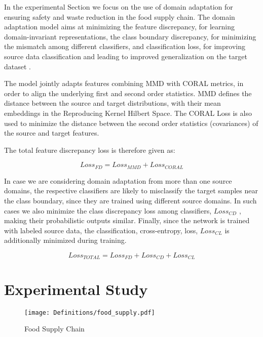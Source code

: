 \documentclass[journal,article,accept,moreauthors,pdftex]{Definitions/mdpi}
\begin{document}
In the experimental Section we focus on the use of domain adaptation for ensuring safety and waste reduction in the food supply chain. The domain adaptation model
aims at minimizing the feature discrepancy, for
learning domain-invariant representations, the class boundary
discrepancy, for minimizing the mismatch among different classifiers,
and classification loss, for improving source data classification and leading to improved generalization
on the target dataset \cite{ref25}.

The model jointly adapts
features combining MMD with CORAL metrics, in order to align the underlying first and second order statistics.
MMD defines the distance between the source and target distributions,
with their mean embeddings in the Reproducing Kernel Hilbert
Space. The CORAL Loss is also  used to minimize the distance between the second order
statistics (covariances) of the source and target features.

The total feature discrepancy loss is therefore given as: 

\begin{equation}
\label{eq: loss}
Loss_{FD} = Loss_{MMD} + Loss_{CORAL}
\end{equation}


In case we are considering domain adaptation from  more than one source domains, the respective classifiers are likely to misclassify
the target samples near the class boundary, since they are
trained using different source domains. In such cases we also minimize the class discrepancy loss
among classifiers, $Loss_{CD}$ \cite{ref25}, making their probabilistic outputs
similar. Finally, since the network is trained with labeled source data, the classification, cross-entropy, loss, $Loss_{CL}$ is additionally minimized during training.



\begin{equation}
\label{eq: loss1}
Loss_{TOTAL} = Loss_{FD} + Loss_{CD} + Loss_{CL}
\end{equation}

\section{Experimental Study}

\begin{figure*}[tph!]
\texttt{[image: Definitions/food\_supply.pdf]}
\centering
\caption{Food Supply Chain}
\label{fig:food_supply diagram}
\end{figure*}
\end{document}
